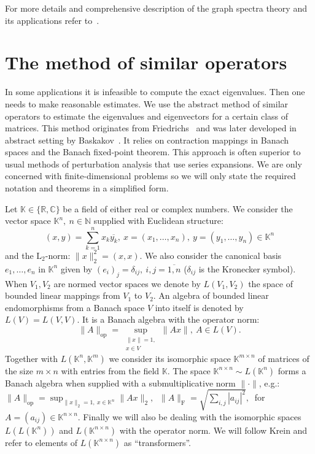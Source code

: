 \documentclass[a4paper]{article}
\theoremstyle{definition}
\begin{document}
For more details and comprehensive description
    of the graph spectra theory
    and its applications
    refer to~\cite{cvetkovic1980spectra,cvetkovic2010introduction,godsil2013algebraic}.

\section{The method of similar operators}

In some applications
    it is infeasible to compute the exact eigenvalues.
Then one needs to make reasonable estimates.
We use the abstract method of similar operators
    to estimate the eigenvalues and eigenvectors
    for a certain class of matrices.
This method originates from Friedrichs~\cite{friedrichs1965advanced}
    and was later developed in abstract setting
    by Baskakov~\cite{baskakov1983methods,baskakov2017method,baskakov2013completeness}.
It relies on contraction mappings in Banach spaces
    and the Banach fixed-point theorem.
This approach is often superior to usual methods of perturbation analysis
    that use series expansions.
We are only concerned with finite-dimensional problems
    so we will only state the required notation and theorems
    in a simplified form.

Let \( \mathbb{K}\in \{ \mathbb{R}, \mathbb{C} \} \)
    be a field of either real or complex numbers.
We consider the vector space \( \mathbb{K}^n,\ n\in \mathbb{N} \)
    supplied with Euclidean structure:
    \[
        (x, y){=}\sum_{k=1}^n x_k\overline{y_k},
        \ x{=}(x_1,\ldots, x_n),
        \ y=(y_1,\ldots, y_n)
        \in \mathbb{K}^n
        \]
    and the \( \mathrm{L}_2 \)-norm:
    \(
        \|x\|_2^2{=}(x,x).
        \)
We also consider the canonical basis \( e_1, \ldots, e_n \)
    in \( \mathbb{K}^n \) given by
    \( {(e_i)}_j = \delta_{ij},\ i,j=\overline{1,n} \)
    (\(\delta_{ij} \) is the Kronecker symbol).
When \( V_1, V_2 \) are normed vector spaces
    we denote by \( L(V_1, V_2) \)
    the space of bounded linear mappings
    from \( V_1 \) to \( V_2 \).
An algebra of bounded linear endomorphisms
    from a Banach space \( V \)
    into itself
    is denoted by \( L(V) = L(V, V) \).
It is a Banach algebra with the operator norm:
    \[
        \|A\|_{\mathrm{op}} =
        \sup_{
            \substack{\|x\|=1,\\ x\in V}
        } \|A x\|,\ A\in L(V).
        \]
Together with \( L(\mathbb{K}^n, \mathbb{K}^m) \)
    we consider its isomorphic space \( \mathbb{K}^{m{\times}n} \)
    of matrices of the size \( m{\times}n \)
    with entries from the field \( \mathbb{K} \).
The space \( \mathbb{K}^{n{\times}n}\sim L(\mathbb{K}^n) \)
    forms a Banach algebra
    when supplied with a submultiplicative norm
    \( \|\cdot\| \),
    e.g.: \( \|A\|_{\mathrm{op}} = \sup_{\|x\|_2=1,\ x\in \mathbb{K}^n} \|A x\|_2,\ \)
    \( \|A\|_{\mathrm{F}} = \sqrt{\sum_{i,j} |a_{ij}|^2},\ \)
    for 
    \( A{=}(a_{ij})\in\mathbb{K}^{n\times n} \).
Finally we will also be dealing with the isomorphic spaces
    \( L(L(\mathbb{K}^n)) \) and \( L(\mathbb{K}^{n{\times}n}) \)
    with the operator norm.
We will follow Krein
    and refer to elements of \( L(\mathbb{K}^{n{\times}n}) \)
    as ``transformers''.
\end{document}
